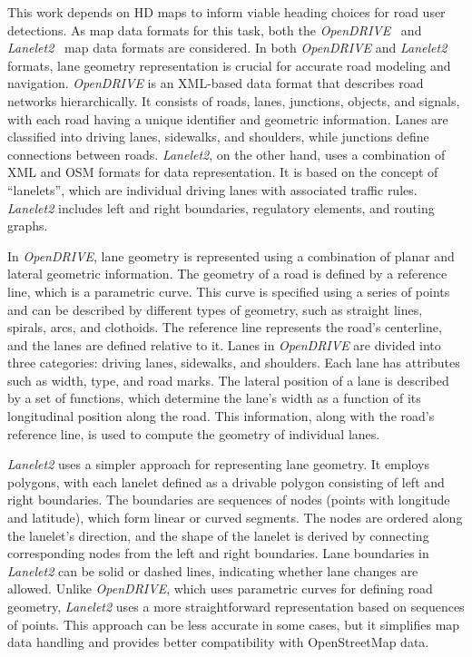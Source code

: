 This work depends on HD maps to inform viable heading choices for road user detections.
As map data formats for this task, both the \textit{OpenDRIVE}~\cite{dupuis2010opendrive, althoff2018automatic} and \textit{Lanelet2}~\cite{poggenhans2018lanelet2} map data formats are considered.
In both \textit{OpenDRIVE} and \textit{Lanelet2} formats, lane geometry representation is crucial for accurate road modeling and navigation.
\textit{OpenDRIVE} is an XML-based data format that describes road networks hierarchically.
It consists of roads, lanes, junctions, objects, and signals, with each road having a unique identifier and geometric information.
Lanes are classified into driving lanes, sidewalks, and shoulders, while junctions define connections between roads.
\textit{Lanelet2}, on the other hand, uses a combination of XML and OSM formats for data representation.
It is based on the concept of \enquote{lanelets}, which are individual driving lanes with associated traffic rules.
\textit{Lanelet2} includes left and right boundaries, regulatory elements, and routing graphs.

In \textit{OpenDRIVE}, lane geometry is represented using a combination of planar and lateral geometric information.
The geometry of a road is defined by a reference line, which is a parametric curve.
This curve is specified using a series of points and can be described by different types of geometry, such as straight lines, spirals, arcs, and clothoids.
The reference line represents the road's centerline, and the lanes are defined relative to it.
Lanes in \textit{OpenDRIVE} are divided into three categories: driving lanes, sidewalks, and shoulders.
Each lane has attributes such as width, type, and road marks.
The lateral position of a lane is described by a set of functions, which determine the lane's width as a function of its longitudinal position along the road.
This information, along with the road's reference line, is used to compute the geometry of individual lanes.

\textit{Lanelet2} uses a simpler approach for representing lane geometry.
It employs polygons, with each lanelet defined as a drivable polygon consisting of left and right boundaries.
The boundaries are sequences of nodes (points with longitude and latitude), which form linear or curved segments.
The nodes are ordered along the lanelet's direction, and the shape of the lanelet is derived by connecting corresponding nodes from the left and right boundaries.
Lane boundaries in \textit{Lanelet2} can be solid or dashed lines, indicating whether lane changes are allowed.
Unlike \textit{OpenDRIVE}, which uses parametric curves for defining road geometry, \textit{Lanelet2} uses a more straightforward representation based on sequences of points.
This approach can be less accurate in some cases, but it simplifies map data handling and provides better compatibility with OpenStreetMap data.

